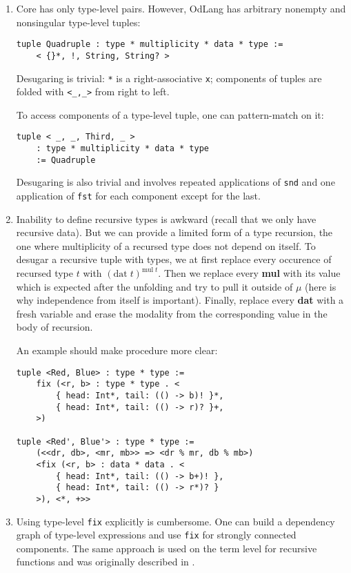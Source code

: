 \documentclass[a4paper,14pt]{extreport}
\begin{document}
\begin{enumerate}
    \item Core has only type-level pairs. However, OdLang has arbitrary nonempty
        and nonsingular type-level tuples:
\begin{verbatim}
tuple Quadruple : type * multiplicity * data * type :=
    < {}*, !, String, String? >
\end{verbatim}
        Desugaring is trivial: \verb|*| is a right-associative \verb|x|;
        components of tuples are folded with \verb|<_,_>| from right to left.

        To access components of a type-level tuple, one can pattern-match on it:
\begin{verbatim}
tuple < _, _, Third, _ >
    : type * multiplicity * data * type
    := Quadruple
\end{verbatim}
        Desugaring is also trivial and involves repeated applications of
        \verb|snd| and one application of \verb|fst| for each component except
        for the last.
    \item Inability to define recursive types is awkward (recall that we only
        have recursive data). But we can provide a limited form of a type
        recursion, the one where multiplicity of a recursed type does not depend
        on itself. To desugar a recursive tuple with types, we at first replace
        every occurence of recursed type $t$ with
        $(\text{dat}\;t)^{\text{mul}\;t}$. Then we replace every \textbf{mul}
        with its value which is expected after the unfolding and try to pull it
        outside of $\mu$ (here is why independence from itself is important).
        Finally, replace every \textbf{dat} with a fresh variable and erase
        the modality from the corresponding value in the body of recursion.

        An example should make procedure more clear:
\begin{verbatim}
tuple <Red, Blue> : type * type :=
    fix (<r, b> : type * type . <
        { head: Int*, tail: (() -> b)! }*,
        { head: Int*, tail: (() -> r)? }+,
    >)

tuple <Red', Blue'> : type * type :=
    (<<dr, db>, <mr, mb>> => <dr % mr, db % mb>)
    <fix (<r, b> : data * data . <
        { head: Int*, tail: (() -> b+)! },
        { head: Int*, tail: (() -> r*)? }
    >), <*, +>>
\end{verbatim}
    \item Using type-level \verb|fix| explicitly is cumbersome. One can build a
        dependency graph of type-level expressions and use \verb|fix| for
        strongly connected components. The same approach is used on the term
        level for recursive functions and was originally described in
        \cite{spj}.


\end{enumerate}
\end{document}
